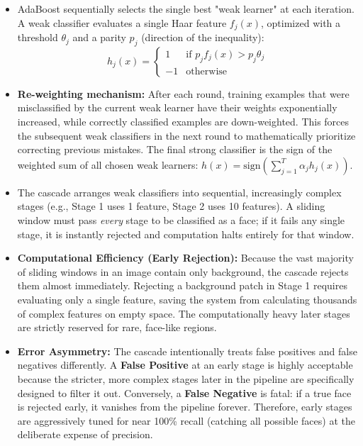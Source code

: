 {
\begin{itemize}
    \item AdaBoost sequentially selects the single best "weak learner" at each iteration. A weak classifier evaluates a single Haar feature $f_j(x)$, optimized with a threshold $\theta_j$ and a parity $p_j$ (direction of the inequality):
    $$h_j(x) = \begin{cases} 1 & \text{if } p_j f_j(x) > p_j \theta_j \\ -1 & \text{otherwise} \end{cases}$$
    \item \textbf{Re-weighting mechanism:} After each round, training examples that were misclassified by the current weak learner have their weights exponentially increased, while correctly classified examples are down-weighted. This forces the subsequent weak classifiers in the next round to mathematically prioritize correcting previous mistakes. The final strong classifier is the sign of the weighted sum of all chosen weak learners: $h(x) = \text{sign}\left(\sum_{j=1}^{T} \alpha_j h_j(x)\right)$.
\end{itemize}}

{
\begin{itemize}
    \item The cascade arranges weak classifiers into sequential, increasingly complex stages (e.g., Stage 1 uses 1 feature, Stage 2 uses 10 features). A sliding window must pass \textit{every} stage to be classified as a face; if it fails any single stage, it is instantly rejected and computation halts entirely for that window.
    \item \textbf{Computational Efficiency (Early Rejection):} Because the vast majority of sliding windows in an image contain only background, the cascade rejects them almost immediately. Rejecting a background patch in Stage 1 requires evaluating only a single feature, saving the system from calculating thousands of complex features on empty space. The computationally heavy later stages are strictly reserved for rare, face-like regions.
    \item \textbf{Error Asymmetry:} The cascade intentionally treats false positives and false negatives differently. A \textbf{False Positive} at an early stage is highly acceptable because the stricter, more complex stages later in the pipeline are specifically designed to filter it out. Conversely, a \textbf{False Negative} is fatal: if a true face is rejected early, it vanishes from the pipeline forever. Therefore, early stages are aggressively tuned for near 100\% recall (catching all possible faces) at the deliberate expense of precision.
\end{itemize}}

